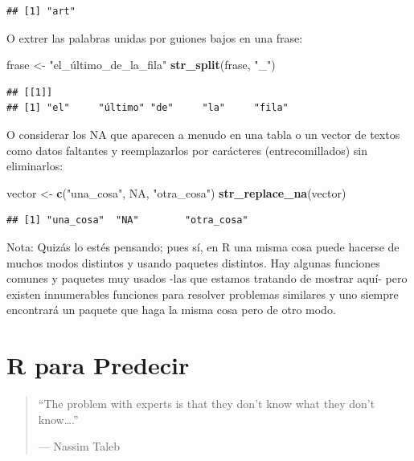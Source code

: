 \documentclass[]{book}
\newenvironment{Shaded}{\begin{snugshade}}{\end{snugshade}}
\newcommand{\KeywordTok}[1]{\textcolor[rgb]{0.13,0.29,0.53}{\textbf{#1}}}
\newcommand{\NormalTok}[1]{#1}
\newcommand{\OtherTok}[1]{\textcolor[rgb]{0.56,0.35,0.01}{#1}}
\newcommand{\StringTok}[1]{\textcolor[rgb]{0.31,0.60,0.02}{#1}}
\theoremstyle{definition}
\theoremstyle{definition}
\theoremstyle{definition}
\theoremstyle{remark}
\begin{document}
\begin{verbatim}
## [1] "art"
\end{verbatim}

O extrer las palabras unidas por guiones bajos en una frase:

\begin{Shaded}
\begin{Highlighting}[]
\NormalTok{frase <-}\StringTok{ "el_último_de_la_fila"}
 \KeywordTok{str_split}\NormalTok{(frase, }\StringTok{"_"}\NormalTok{)}
\end{Highlighting}
\end{Shaded}

\begin{verbatim}
## [[1]]
## [1] "el"     "último" "de"     "la"     "fila"
\end{verbatim}

O considerar los NA que aparecen a menudo en una tabla o un vector de
textos como datos faltantes y reemplazarlos por carácteres
(entrecomillados) sin eliminarlos:

\begin{Shaded}
\begin{Highlighting}[]
\NormalTok{vector <-}\StringTok{ }\KeywordTok{c}\NormalTok{(}\StringTok{"una_cosa"}\NormalTok{, }\OtherTok{NA}\NormalTok{, }\StringTok{"otra_cosa"}\NormalTok{)}
\KeywordTok{str_replace_na}\NormalTok{(vector)}
\end{Highlighting}
\end{Shaded}

\begin{verbatim}
## [1] "una_cosa"  "NA"        "otra_cosa"
\end{verbatim}

Nota: Quizás lo estés pensando; pues sí, en R una misma cosa puede
hacerse de muchos modos distintos y usando paquetes distintos. Hay
algunas funciones comunes y paquetes muy usados -las que estamos
tratando de mostrar aquí- pero existen innumerables funciones para
resolver problemas similares y uno siempre encontrará un paquete que
haga la misma cosa pero de otro modo.

\hypertarget{r-para-predecir}{%
\chapter{R para Predecir}\label{r-para-predecir}}

\begin{quote}
``The problem with experts is that they don't know what they don't
know\ldots{}.''

--- Nassim Taleb
\end{quote}
\end{document}
